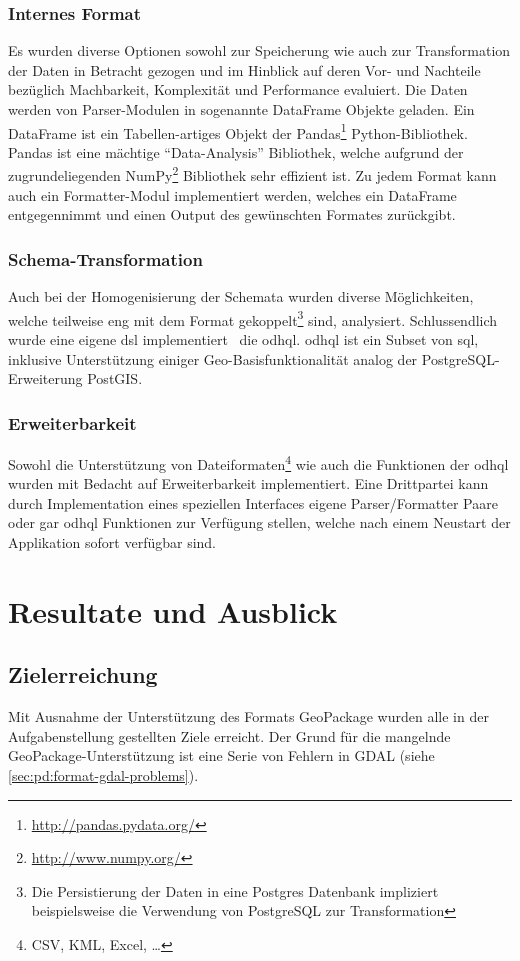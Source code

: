 \subsection{Internes Format}
Es wurden diverse Optionen sowohl zur Speicherung wie auch zur Transformation der Daten in Betracht gezogen und im Hinblick auf deren Vor- und Nachteile bezüglich Machbarkeit, Komplexität und Performance evaluiert. Die Daten werden von Parser-Modulen in sogenannte DataFrame Objekte geladen. 
Ein DataFrame ist ein Tabellen-artiges Objekt der Pandas\footnote{\url{http://pandas.pydata.org/}} Python-Bibliothek. Pandas ist eine mächtige ``Data-Analysis'' Bibliothek, welche aufgrund der zugrundeliegenden NumPy\footnote{\url{http://www.numpy.org/}} Bibliothek sehr effizient ist.
Zu jedem Format kann auch ein Formatter-Modul implementiert werden, welches ein DataFrame entgegennimmt und einen Output des gewünschten Formates zurückgibt.

\subsection{Schema-Transformation}
Auch bei der Homogenisierung der Schemata wurden diverse Möglichkeiten, welche teilweise eng mit dem Format gekoppelt\footnote{Die Persistierung der Daten in eine Postgres Datenbank impliziert beispielsweise die Verwendung von PostgreSQL zur Transformation} sind, analysiert. Schlussendlich wurde eine eigene \gls{dsl} implementiert \textendash\ die \acf{odhql}. \acs{odhql} ist ein Subset von \acs{sql}, inklusive Unterstützung einiger Geo-Basisfunktionalität analog der PostgreSQL-Erweiterung PostGIS.

\subsection{Erweiterbarkeit}
Sowohl die Unterstützung von Dateiformaten\footnote{CSV, KML, Excel, \dots} wie auch die Funktionen der \acl{odhql} wurden mit Bedacht auf Erweiterbarkeit implementiert. Eine Drittpartei kann durch Implementation eines speziellen Interfaces eigene Parser/Formatter Paare oder gar \gls{odhql} Funktionen zur Verfügung stellen, welche nach einem Neustart der Applikation sofort verfügbar sind.


\chapter{Resultate und Ausblick} \label{sec:tb:results}
\section{Zielerreichung}
Mit Ausnahme der Unterstützung des Formats GeoPackage wurden alle in der Aufgabenstellung gestellten Ziele erreicht. Der Grund für die mangelnde GeoPackage-Unterstützung ist eine Serie von Fehlern in GDAL (siehe \vref{sec:pd:format-gdal-problems}).

